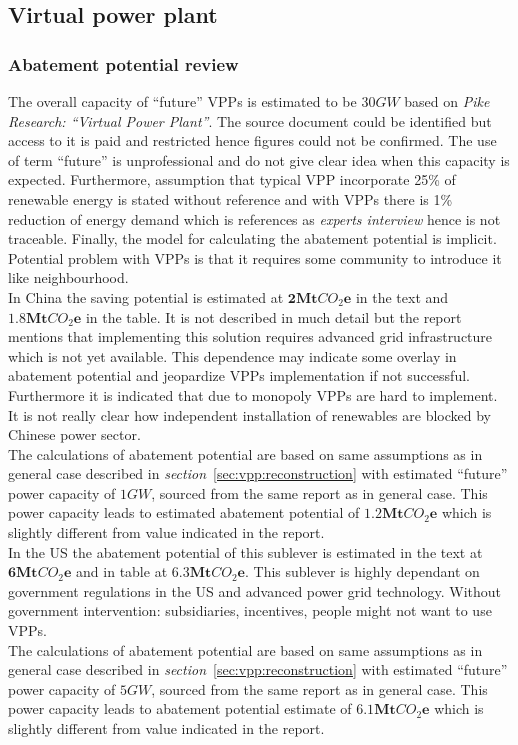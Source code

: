\documentclass[11pt, twocolumn]{article}
\begin{document}
\subsection{Virtual power plant}
\subsubsection{Abatement potential review}
The overall capacity of ``future'' VPPs is estimated to be $30GW$ based on \emph{Pike Research: ``Virtual Power Plant''}. The source document could be identified but access to it is paid and restricted hence figures could not be confirmed. The use of term ``future'' is unprofessional and do not give clear idea when this capacity is expected. Furthermore, assumption that typical VPP incorporate 25\% of renewable energy is stated without reference and with VPPs there is 1\% reduction of energy demand which is references as \emph{experts interview} hence is not traceable. Finally, the model for calculating the abatement potential is implicit.\\
Potential problem with VPPs is that it requires some community to introduce it like neighbourhood.\\

In China the saving potential is estimated at $\mathbf{2} \mathbf{Mt}CO_2\mathbf{e}$ in the text and $\mathbf{1.8} \mathbf{Mt}CO_2\mathbf{e}$ in the table. It is not described in much detail but the report mentions that implementing this solution requires advanced grid infrastructure which is not yet available. This dependence may indicate some overlay in abatement potential and jeopardize VPPs implementation if not successful. Furthermore it is indicated that due to monopoly VPPs are hard to implement. It is not really clear how independent installation of renewables are blocked by Chinese power sector.\\
The calculations of abatement potential are based on same assumptions as in general case described in \emph{section}~\ref{sec:vpp:reconstruction} with estimated ``future'' power capacity of $1GW$, sourced from the same report as in general case. This power capacity leads to estimated abatement potential of $\mathbf{1.2} \mathbf{Mt}CO_2\mathbf{e}$ which is slightly different from value indicated in the report.\\

In the US the abatement potential of this sublever is estimated in the text at $\mathbf{6} \mathbf{Mt}CO_2\mathbf{e}$ and in table at $\mathbf{6.3} \mathbf{Mt}CO_2\mathbf{e}$. This sublever is highly dependant on government regulations in the US and advanced power grid technology. Without government intervention: subsidiaries, incentives, people might not want to use VPPs.\\
The calculations of abatement potential are based on same assumptions as in general case described in \emph{section}~\ref{sec:vpp:reconstruction} with estimated ``future'' power capacity of $5GW$, sourced from the same report as in general case. This power capacity leads to abatement potential estimate of $\mathbf{6.1} \mathbf{Mt}CO_2\mathbf{e}$ which is slightly different from value indicated in the report.\\
\end{document}
